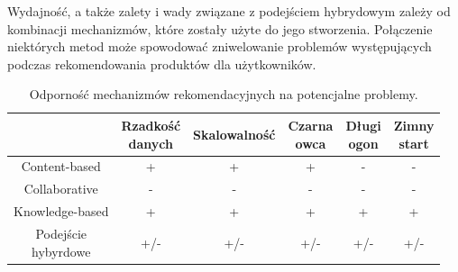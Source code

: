 Wydajność, a także zalety i wady związane z podejściem hybrydowym zależy od kombinacji mechanizmów, które zostały użyte do jego stworzenia. Połączenie niektórych metod może spowodować zniwelowanie problemów występujących podczas rekomendowania produktów dla użytkowników.

\begin{table}[h]
\centering
\caption{Odporność mechanizmów rekomendacyjnych na potencjalne problemy.}
\begin{tabular}{|c|c|c|c|c|c|}
\hline
&
\specialcell{Rzadkość\\danych} &
Skalowalność &
\specialcell{Czarna\\owca} &
\specialcell{Długi\\ogon} &
\specialcell{Zimny\\start}
\\
\hline
  
Content-based &
+ &
+ &
+ &
- &
-
\\
\hline
  
Collaborative &
- &
- &
- &
- &
-
\\
\hline

Knowledge-based &
+ &
+ &
+ &
+ &
+
\\
\hline

\specialcell{Podejście\\hybyrdowe} &
+/- &
+/- &
+/- &
+/- &
+/-
\\
\hline
\end{tabular} 
\label{tabelaMetProblem}
\end{table}
